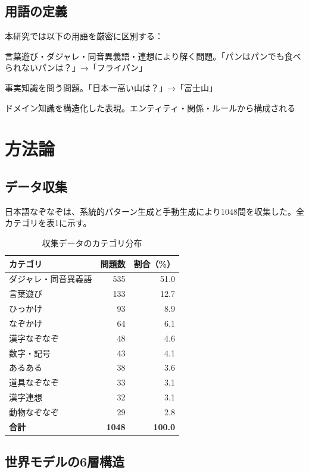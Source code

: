 \documentclass[a4paper,11pt]{ltjsarticle}
\begin{document}
\subsection{用語の定義}

本研究では以下の用語を厳密に区別する：
\begin{description}[style=nextline]
    \item[なぞなぞ] 言葉遊び・ダジャレ・同音異義語・連想により解く問題。「パンはパンでも食べられないパンは？」→「フライパン」
    \item[クイズ] 事実知識を問う問題。「日本一高い山は？」→「富士山」
    \item[世界モデル] ドメイン知識を構造化した表現。エンティティ・関係・ルールから構成される
\end{description}

\section{方法論}

\subsection{データ収集}

日本語なぞなぞは、系統的パターン生成と手動生成により1048問を収集した。全カテゴリを表1に示す。

\begin{table}[htbp]
\caption{収集データのカテゴリ分布}
\centering
\begin{tabular}{lrr}
\toprule
カテゴリ & 問題数 & 割合（\%）\\
\midrule
ダジャレ・同音異義語 & 535 & 51.0\\
言葉遊び & 133 & 12.7\\
ひっかけ & 93 & 8.9\\
なぞかけ & 64 & 6.1\\
漢字なぞなぞ & 48 & 4.6\\
数字・記号 & 43 & 4.1\\
あるある & 38 & 3.6\\
道具なぞなぞ & 33 & 3.1\\
漢字連想 & 32 & 3.1\\
動物なぞなぞ & 29 & 2.8\\
\midrule
\textbf{合計} & \textbf{1048} & \textbf{100.0}\\
\bottomrule
\end{tabular}
\end{table}

\subsection{世界モデルの6層構造}
\end{document}
